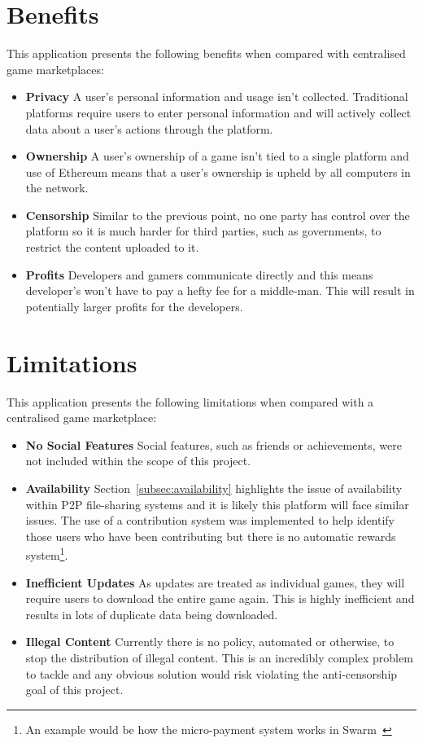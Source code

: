 
\section{Benefits}\label{des:benefits}

This application presents the following benefits when compared with centralised game marketplaces:

\begin{itemize}
  \item \textbf{Privacy} A user's personal information and usage isn't collected. Traditional platforms require users to enter personal information and will actively collect data about a user's actions through the platform.
  \item \textbf{Ownership} A user's ownership of a game isn't tied to a single platform and use of Ethereum means that a user's ownership is upheld by all computers in the network.
  \item \textbf{Censorship} Similar to the previous point, no one party has control over the platform so it is much harder for third parties, such as governments, to restrict the content uploaded to it.
  \item \textbf{Profits} Developers and gamers communicate directly and this means developer's won't have to pay a hefty fee for a middle-man. This will result in potentially larger profits for the developers.  
\end{itemize}

\section{Limitations}\label{sec:design-lim}

This application presents the following limitations when compared with a centralised game marketplace:

\begin{itemize}
  \item \textbf{No Social Features} Social features, such as friends or achievements, were not included within the scope of this project.
  \item \textbf{Availability} Section~\ref{subsec:availability} highlights the issue of availability within P2P file-sharing systems and it is likely this platform will face similar issues.
  The use of a contribution system was implemented to help identify those users who have been contributing but there is no automatic rewards system\footnote{An example would be how the micro-payment system works in Swarm~\cite{hartman_swarm_1999}}.
  \item \textbf{Inefficient Updates} As updates are treated as individual games, they will require users to download the entire game again. This is highly inefficient and results in lots of duplicate data being downloaded.
  \item \textbf{Illegal Content} Currently there is no policy, automated or otherwise, to stop the distribution of illegal content. This is an incredibly complex problem to tackle and any obvious solution would risk violating the anti-censorship goal of this project. 
\end{itemize}